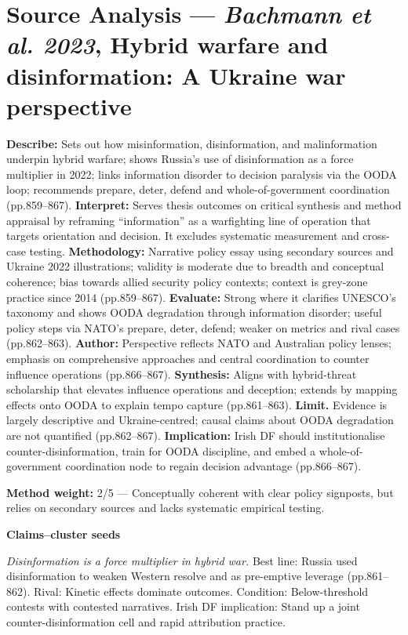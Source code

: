\section*{Source Analysis — \textit{Bachmann et al. 2023}, Hybrid warfare and disinformation: A Ukraine war perspective}
\textbf{Describe:} Sets out how misinformation, disinformation, and malinformation underpin hybrid warfare; shows Russia’s use of disinformation as a force multiplier in 2022; links information disorder to decision paralysis via the OODA loop; recommends prepare, deter, defend and whole-of-government coordination (pp.859–867).
\textbf{Interpret:} Serves thesis outcomes on critical synthesis and method appraisal by reframing “information” as a warfighting line of operation that targets orientation and decision. It excludes systematic measurement and cross-case testing.
\textbf{Methodology:} Narrative policy essay using secondary sources and Ukraine 2022 illustrations; validity is moderate due to breadth and conceptual coherence; bias towards allied security policy contexts; context is grey-zone practice since 2014 (pp.859–867).
\textbf{Evaluate:} Strong where it clarifies UNESCO’s taxonomy and shows OODA degradation through information disorder; useful policy steps via NATO’s prepare, deter, defend; weaker on metrics and rival cases (pp.862–863).
\textbf{Author:} Perspective reflects NATO and Australian policy lenses; emphasis on comprehensive approaches and central coordination to counter influence operations (pp.866–867).
\textbf{Synthesis:} Aligns with hybrid-threat scholarship that elevates influence operations and deception; extends by mapping effects onto OODA to explain tempo capture (pp.861–863).
\textbf{Limit.} Evidence is largely descriptive and Ukraine-centred; causal claims about OODA degradation are not quantified (pp.862–867).
\textbf{Implication:} Irish DF should institutionalise counter-disinformation, train for OODA discipline, and embed a whole-of-government coordination node to regain decision advantage (pp.866–867).

\textbf{Method weight:} 2/5 — Conceptually coherent with clear policy signposts, but relies on secondary sources and lacks systematic empirical testing.

\textbf{Claims–cluster seeds}

\textit{Disinformation is a force multiplier in hybrid war.} Best line: Russia used disinformation to weaken Western resolve and as pre-emptive leverage (pp.861–862). Rival: Kinetic effects dominate outcomes. Condition: Below-threshold contests with contested narratives. Irish DF implication: Stand up a joint counter-disinformation cell and rapid attribution practice.

